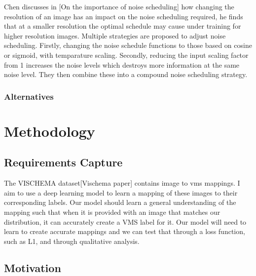 \documentclass{UoYCSproject}
\begin{document}

Chen discusses in [On the importance of noise scheduling] how changing the resolution of an image has an impact on the noise scheduling required, he finds that at a smaller resolution the optimal schedule may cause under training for higher resolution images. Multiple strategies are proposed to adjust noise scheduling. Firstly, changing the noise schedule functions to those based on cosine or sigmoid, with temparature scaling. Secondly, reducing the input scaling factor from 1 increases the noise levels which destroys more information at the same noise level. They then combine these into a compound noise scheduling strategy.


\subsection{Alternatives}

\newpage{}

\chapter{Methodology}



\section{Requirements Capture}

The VISCHEMA dataset[Vischema paper] contains image to vms mappings. I aim to use a deep learning model to learn a mapping of these images to their corresponding labels. Our model should learn a general understanding of the mapping such that when it is provided with an image that matches our distribution, it can accurately create a VMS label for it. Our model will need to learn to create accurate mappings and we can test that through a loss function, such as L1, and through qualitative analysis.

\section{Motivation}
\end{document}
